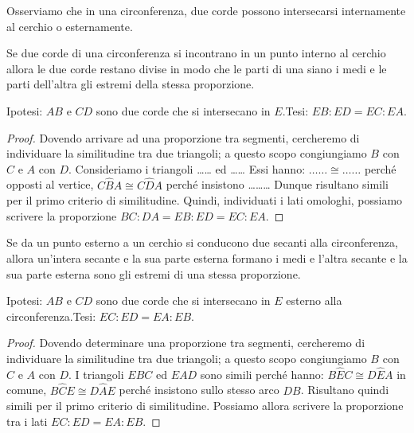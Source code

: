 Osserviamo che in una circonferenza, due corde possono intersecarsi internamente al cerchio o esternamente.
\begin{teorema}
Se due corde di una circonferenza si incontrano in un punto interno al cerchio allora le due corde restano divise in modo che le parti di una siano i medi e le parti dell'altra gli estremi della stessa proporzione.
\end{teorema}

\noindent Ipotesi: $AB$ e $CD$ sono due corde che si intersecano in $E$.\tab Tesi: $EB:ED=EC:EA$.

\noindent\begin{minipage}{0.65\textwidth}\parindent15pt
\begin{proof}
Dovendo arrivare ad una proporzione tra segmenti, cercheremo di individuare la similitudine tra due triangoli; a questo scopo congiungiamo $B$ con $C$ e $A$ con $D$. Consideriamo i triangoli \ldots\ldots{} ed \ldots\ldots{} Essi hanno: $\ldots\ldots{}\cong\ldots\ldots{}$ perché opposti al vertice, $C\widehat{B}A\cong C\widehat{D}A$ perché insistono \ldots\ldots\ldots{} Dunque risultano simili per il primo criterio di similitudine. Quindi, individuati i lati omologhi, possiamo scrivere la proporzione $BC:DA=EB:ED=EC:EA$.
\end{proof}
\end{minipage}\hfil
\begin{minipage}{0.35\textwidth}
	\centering
\end{minipage}\vspace{5pt}

\begin{teorema}
Se da un punto esterno a un cerchio si conducono due secanti alla circonferenza, allora un'intera secante e la sua parte esterna formano i medi e l'altra secante e la sua parte esterna sono gli estremi di una stessa proporzione.
\end{teorema}

\noindent Ipotesi: $AB$ e $CD$ sono due corde che si intersecano in $E$ esterno alla circonferenza.\tab Tesi: $EC:ED=EA:EB$.

\noindent\begin{minipage}{0.65\textwidth}\parindent15pt
\begin{proof}
Dovendo determinare una proporzione tra segmenti, cercheremo di individuare la similitudine tra due triangoli; a questo scopo congiungiamo $B$ con $C$ e $A$ con $D$. I triangoli $EBC$ ed $EAD$ sono simili perché hanno: $B\widehat{E}C\cong D\widehat{E}A$ in comune, $B\widehat{C}E\cong D\widehat{A}E$ perché insistono sullo stesso arco $DB$. Risultano quindi simili per il primo criterio di similitudine. Possiamo allora scrivere la proporzione tra i lati $EC:ED=EA:EB$.
\end{proof}
\end{minipage}\hfil
\begin{minipage}{0.35\textwidth}
	\centering
\end{minipage}\vspace{5pt}

